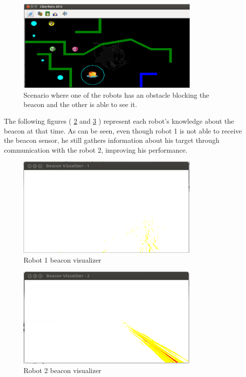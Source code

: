 \documentclass[oribibl]{llncs}
\begin{document}
\begin{figure}
  \centering
  \includegraphics[width=0.8\textwidth]{viewer.png}
  \caption{Scenario where one of the robots has an obstacle blocking the beacon and the other is able to see it.}
  \label{fig:viewer}
\end{figure}

The following figures ( \ref{fig:visualizer1} and \ref{fig:visualizer2} ) represent each robot's knowledge about the beacon at that time. As can be seen, even though robot 1 is not able to receive the beacon sensor, he still gathers information about his target through communication with the robot 2, improving his performance.

\begin{figure}
  \centering
  \includegraphics[width=0.8\textwidth]{visualizer1.png}
  \caption{Robot 1 beacon visualizer}
  \label{fig:visualizer1}
\end{figure}

\begin{figure}
  \centering
  \includegraphics[width=0.8\textwidth]{visualizer2.png}
  \caption{Robot 2 beacon visualizer}
  \label{fig:visualizer2}
\end{figure}
\end{document}
